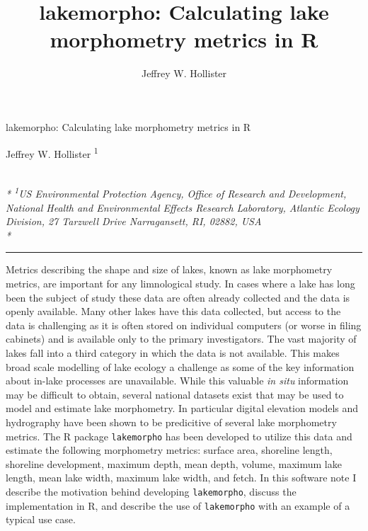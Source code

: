 \documentclass[11pt,]{article}
\title{lakemorpho: Calculating lake morphometry metrics in R}
\author{
Jeffrey W. Hollister
}
\date{}
\begin{document}
\begin{singlespace}
\begin{center}
\huge lakemorpho: Calculating lake morphometry metrics in R
\end{center}
\begin{center}
\large
Jeffrey W. Hollister \textsuperscript{1} 
\end{center}
\begin{justify}
\footnotesize \emph{ 
\\*
\textsuperscript{1}US Environmental Protection Agency, Office of Research and Development,
National Health and Environmental Effects Research Laboratory, Atlantic
Ecology Division, 27 Tarzwell Drive Narragansett, RI, 02882, USA\\*
}
\setcounter{num}{1}
\\[0.1cm]
\footnotesize \emph{ 
}
\end{justify}
\normalsize

\end{singlespace}


\singlespace

\vspace{2mm}

\hrule

Metrics describing the shape and size of lakes, known as lake
morphometry metrics, are important for any limnological study. In cases
where a lake has long been the subject of study these data are often
already collected and the data is openly available. Many other lakes
have this data collected, but access to the data is challenging as it is
often stored on individual computers (or worse in filing cabinets) and
is available only to the primary investigators. The vast majority of
lakes fall into a third category in which the data is not available.
This makes broad scale modelling of lake ecology a challenge as some of
the key information about in-lake processes are unavailable. While this
valuable \emph{in situ} information may be difficult to obtain, several
national datasets exist that may be used to model and estimate lake
morphometry. In particular digital elevation models and hydrography have
been shown to be predicitive of several lake morphometry metrics. The R
package \texttt{lakemorpho} has been developed to utilize this data and
estimate the following morphometry metrics: surface area, shoreline
length, shoreline development, maximum depth, mean depth, volume,
maximum lake length, mean lake width, maximum lake width, and fetch. In
this software note I describe the motivation behind developing
\texttt{lakemorpho}, discuss the implementation in R, and describe the
use of \texttt{lakemorpho} with an example of a typical use case.
\end{document}
